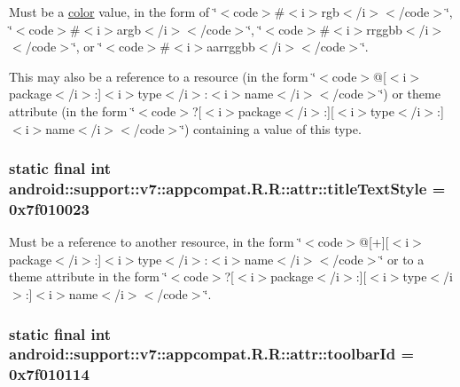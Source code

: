 Must be a \hyperlink{classandroid_1_1support_1_1v7_1_1appcompat_1_1_r_1_1color}{color} value, in the form of \char`\"{}$<$code$>$\#$<$i$>$rgb$<$/i$>$$<$/code$>$\char`\"{}, \char`\"{}$<$code$>$\#$<$i$>$argb$<$/i$>$$<$/code$>$\char`\"{}, \char`\"{}$<$code$>$\#$<$i$>$rrggbb$<$/i$>$$<$/code$>$\char`\"{}, or \char`\"{}$<$code$>$\#$<$i$>$aarrggbb$<$/i$>$$<$/code$>$\char`\"{}. 

This may also be a reference to a resource (in the form \char`\"{}$<$code$>$@\mbox{[}$<$i$>$package$<$/i$>$:\mbox{]}$<$i$>$type$<$/i$>$:$<$i$>$name$<$/i$>$$<$/code$>$\char`\"{}) or theme attribute (in the form \char`\"{}$<$code$>$?\mbox{[}$<$i$>$package$<$/i$>$:\mbox{]}\mbox{[}$<$i$>$type$<$/i$>$:\mbox{]}$<$i$>$name$<$/i$>$$<$/code$>$\char`\"{}) containing a value of this type. \hypertarget{classandroid_1_1support_1_1v7_1_1appcompat_1_1_r_1_1attr_2eea3dc90aef80e307b14ccec789e201}{
\subsubsection[{titleTextStyle}]{\setlength{\rightskip}{0pt plus 5cm}static final int android::support::v7::appcompat.R.R::attr::titleTextStyle = 0x7f010023}}
\label{classandroid_1_1support_1_1v7_1_1appcompat_1_1_r_1_1attr_2eea3dc90aef80e307b14ccec789e201}


Must be a reference to another resource, in the form \char`\"{}$<$code$>$@\mbox{[}+\mbox{]}\mbox{[}$<$i$>$package$<$/i$>$:\mbox{]}$<$i$>$type$<$/i$>$:$<$i$>$name$<$/i$>$$<$/code$>$\char`\"{} or to a theme attribute in the form \char`\"{}$<$code$>$?\mbox{[}$<$i$>$package$<$/i$>$:\mbox{]}\mbox{[}$<$i$>$type$<$/i$>$:\mbox{]}$<$i$>$name$<$/i$>$$<$/code$>$\char`\"{}. \hypertarget{classandroid_1_1support_1_1v7_1_1appcompat_1_1_r_1_1attr_0850df25aa8c8f7c36ac62b4c864c186}{
\subsubsection[{toolbarId}]{\setlength{\rightskip}{0pt plus 5cm}static final int android::support::v7::appcompat.R.R::attr::toolbarId = 0x7f010114}}
\label{classandroid_1_1support_1_1v7_1_1appcompat_1_1_r_1_1attr_0850df25aa8c8f7c36ac62b4c864c186}



